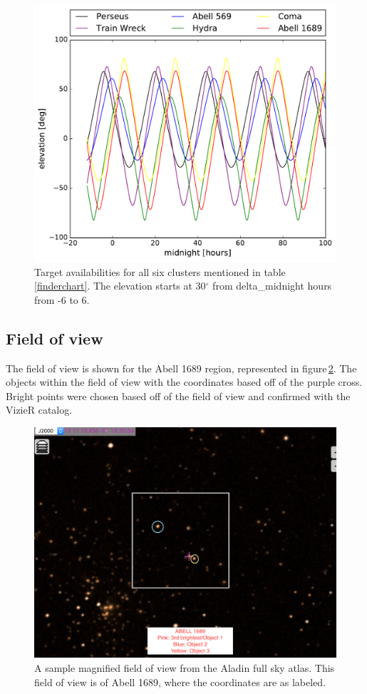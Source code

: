 \documentclass[onecolumn]{aastex6}
\begin{document}
\begin{figure}[ht]
  \centering
  \includegraphics[scale=0.4]{azimuth.pdf}%
  \caption{Target availabilities for all six clusters mentioned in table\,\ref{finderchart}. The elevation starts at 30$^\circ$ from delta\_midnight hours from -6 to 6.}
  \label{targetavail}
\end{figure}


\clearpage
\subsection{Field of view}
The field of view is shown for the Abell 1689 region, represented in figure\,\ref{fov}. The objects within the field of view with the coordinates based off of the purple cross. Bright points were chosen based off of the field of view and confirmed with the VizieR catalog.

\begin{figure}[ht]
  \centering
  \includegraphics[scale=0.3]{aladin.png}%
  \caption{A sample magnified field of view from the Aladin full sky atlas. This field of view is of Abell 1689, where the coordinates are as labeled.}
  \label{fov}
\end{figure}
\end{document}
